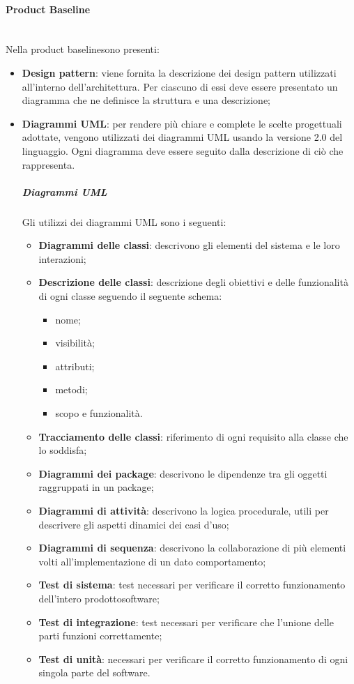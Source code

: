 			\paragraph*{Product Baseline}\mbox{}\\ [1mm]
			Nella product baseline\glosp sono presenti:
			\begin{itemize}
				\item \textbf{Design pattern}: viene fornita la descrizione dei design pattern utilizzati all'interno dell'architettura. Per ciascuno di essi deve essere presentato un diagramma che ne definisce la struttura e una descrizione;
				\item \textbf{Diagrammi UML}: per rendere più chiare e complete le scelte progettuali adottate, vengono utilizzati dei diagrammi UML usando la versione 2.0 del linguaggio. Ogni diagramma deve essere seguito dalla descrizione di ciò che rappresenta.
				\subparagraph*{Diagrammi UML}
				Gli utilizzi dei diagrammi UML sono i seguenti:
				\begin{itemize}
					\item \textbf{Diagrammi delle classi}: descrivono gli elementi del sistema e le loro interazioni;
					\item \textbf{Descrizione delle classi}: descrizione degli obiettivi e delle funzionalità di ogni classe seguendo il seguente schema:
					\begin{itemize}
						\item nome;
						\item visibilità;
						\item attributi;
						\item metodi;
						\item scopo e funzionalità.
					\end{itemize}
					\item \textbf{Tracciamento delle classi}: riferimento di ogni requisito alla classe che lo soddisfa;
					\item \textbf{Diagrammi dei package}: descrivono le dipendenze tra gli oggetti raggruppati in un package;
					\item \textbf{Diagrammi di attività}: descrivono la logica procedurale, utili per descrivere gli aspetti dinamici dei casi d'uso\glo;
					\item \textbf{Diagrammi di sequenza}: descrivono la collaborazione di più elementi volti all'implementazione di un dato comportamento;
					\item \textbf{Test di sistema}: test necessari per verificare il corretto funzionamento dell'intero prodotto\glosp software;
					\item \textbf{Test di integrazione}: test necessari per verificare che l'unione delle parti funzioni correttamente;
					\item \textbf{Test di unità}: necessari per verificare il corretto funzionamento di ogni singola parte del software.
				\end{itemize}
			\end{itemize}
			
